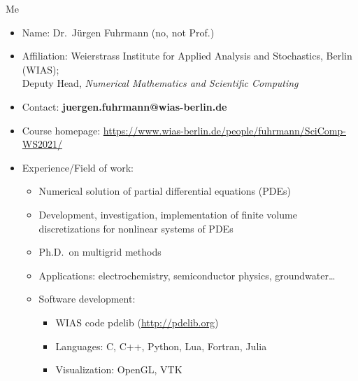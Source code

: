 \begin{frame}{Me}
  \begin{itemize}
  \item
    Name: Dr.~Jürgen Fuhrmann (no, not Prof.)
  \item
    Affiliation: Weierstrass Institute for Applied Analysis and
    Stochastics, Berlin (WIAS);\\ Deputy Head, \emph{Numerical Mathematics and Scientific Computing}
  \item
    Contact: \textbf{juergen.fuhrmann@wias-berlin.de}
  \item Course homepage:  \url{https://www.wias-berlin.de/people/fuhrmann/SciComp-WS2021/}
  \item
    Experience/Field of work:
    
    \begin{itemize}
      \tightlist
    \item
      Numerical solution of partial differential equations (PDEs)
    \item
      Development, investigation, implementation of finite volume
      discretizations for nonlinear systems of PDEs
    \item
      Ph.D.~on multigrid methods
    \item
      Applications: electrochemistry, semiconductor physics,
      groundwater\ldots{}
    \item
      Software development:
      
      \begin{itemize}
        \tightlist
      \item
        WIAS code pdelib (\url{http://pdelib.org})
      \item
        Languages: C, C++, Python, Lua, Fortran, Julia 
      \item
        Visualization: OpenGL, VTK
      \end{itemize}
    \end{itemize}
  \end{itemize}
  
\end{frame}


